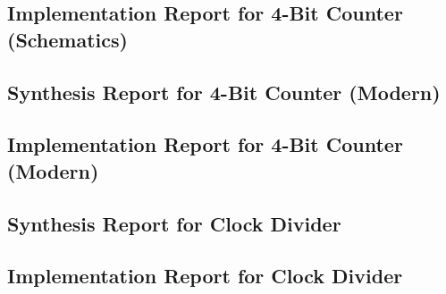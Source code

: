 \documentclass{article}
\begin{document}
\subsection{Implementation Report for 4-Bit Counter (Schematics)}

\newpage
\subsection{Synthesis Report for 4-Bit Counter (Modern)}

\newpage
\subsection{Implementation Report for 4-Bit Counter (Modern)}

\newpage
\subsection{Synthesis Report for Clock Divider}

\newpage
\subsection{Implementation Report for Clock Divider}

\end{document}
